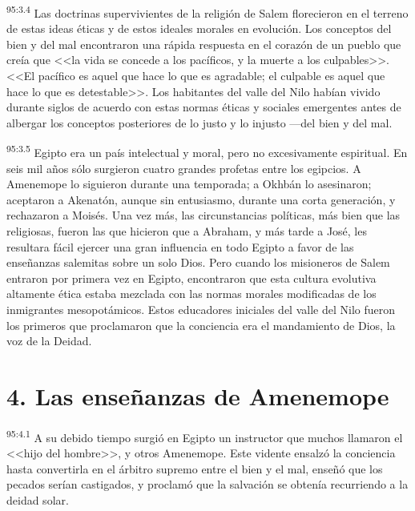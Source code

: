 \par
\textsuperscript{95:3.4} Las doctrinas supervivientes de la religión de Salem florecieron en el terreno de estas ideas éticas y de estos ideales morales en evolución. Los conceptos del bien y del mal encontraron una rápida respuesta en el corazón de un pueblo que creía que <<la vida se concede a los pacíficos, y la muerte a los culpables>>. <<El pacífico es aquel que hace lo que es agradable; el culpable es aquel que hace lo que es detestable>>. Los habitantes del valle del Nilo habían vivido durante siglos de acuerdo con estas normas éticas y sociales emergentes antes de albergar los conceptos posteriores de lo justo y lo injusto ---del bien y del mal.

\par
\textsuperscript{95:3.5} Egipto era un país intelectual y moral, pero no excesivamente espiritual. En seis mil años sólo surgieron cuatro grandes profetas entre los egipcios. A Amenemope lo siguieron durante una temporada; a Okhbán lo asesinaron; aceptaron a Akenatón, aunque sin entusiasmo, durante una corta generación, y rechazaron a Moisés. Una vez más, las circunstancias políticas, más bien que las religiosas, fueron las que hicieron que a Abraham, y más tarde a José, les resultara fácil ejercer una gran influencia en todo Egipto a favor de las enseñanzas salemitas sobre un solo Dios. Pero cuando los misioneros de Salem entraron por primera vez en Egipto, encontraron que esta cultura evolutiva altamente ética estaba mezclada con las normas morales modificadas de los inmigrantes mesopotámicos. Estos educadores iniciales del valle del Nilo fueron los primeros que proclamaron que la conciencia era el mandamiento de Dios, la voz de la Deidad.

\section*{4. Las enseñanzas de Amenemope}
\par
\textsuperscript{95:4.1} A su debido tiempo surgió en Egipto un instructor que muchos llamaron el <<hijo del hombre>>, y otros Amenemope. Este vidente ensalzó la conciencia hasta convertirla en el árbitro supremo entre el bien y el mal, enseñó que los pecados serían castigados, y proclamó que la salvación se obtenía recurriendo a la deidad solar.

